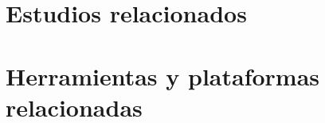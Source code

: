  \label{sec:estado_arte}

\section{Estudios relacionados}







\section{Herramientas y plataformas relacionadas}

